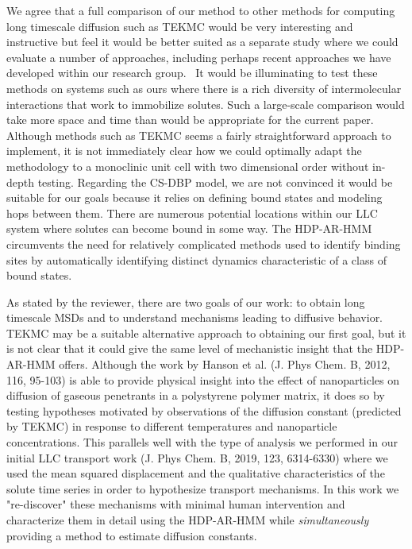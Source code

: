 \documentclass{article}
\begin{document}
\begin{enumerate}[label={Comment \theenumi :}, leftmargin=3.9\parindent]
    We agree that a full comparison of our method to other methods for computing long timescale 
    diffusion such as TEKMC would be very interesting and instructive but feel it would be better 
    suited as a separate study where we could evaluate a number of approaches, including perhaps
    recent approaches we have developed within our research group.~\cite{coscia_capturing_2020}
    It would be illuminating to test these methods on systems such as ours where there is
    a rich diversity of intermolecular interactions that work to immobilize solutes.
    Such a large-scale comparison would take more space and time than would be appropriate for 
    the current paper. Although methods such as TEKMC seems a fairly straightforward approach to
    implement, it is not immediately clear how we could optimally adapt the methodology to a 
    monoclinic unit cell with two dimensional order without in-depth testing.
    Regarding the CS-DBP model, we are not convinced it would be suitable for our goals because
    it relies on defining bound states and modeling hops between them. There are numerous potential
    locations within our LLC system where solutes can become bound in some way. The HDP-AR-HMM
    circumvents the need for relatively complicated methods used to identify binding sites 
    by automatically identifying distinct dynamics characteristic of a class of bound states. 
    
    As stated by the reviewer, there are two goals of our work: to obtain long timescale MSDs and
    to understand mechanisms leading to diffusive behavior. TEKMC may be a suitable alternative 
    approach to obtaining our first goal, but it is not clear that it could give the same level
    of mechanistic insight that the HDP-AR-HMM offers. Although the work by Hanson et al.
    (J. Phys Chem. B, 2012, 116, 95-103) is able to provide physical insight into the effect of
    nanoparticles on diffusion of gaseous penetrants in a polystyrene polymer matrix, it does so
    by testing hypotheses motivated by observations of the diffusion constant (predicted by TEKMC)
    in response to different temperatures and nanoparticle concentrations. This parallels well
    with the type of analysis we performed in our initial LLC transport work (J. Phys Chem. B, 2019, 123, 6314-6330)
    where we used the mean squared displacement and the qualitative characteristics of the solute
    time series in order to hypothesize transport mechanisms. In this work we "re-discover" these
    mechanisms with minimal human intervention and characterize them in detail using the 
    HDP-AR-HMM while \textit{simultaneously} providing a method to estimate diffusion constants.


\end{enumerate}
\end{document}
